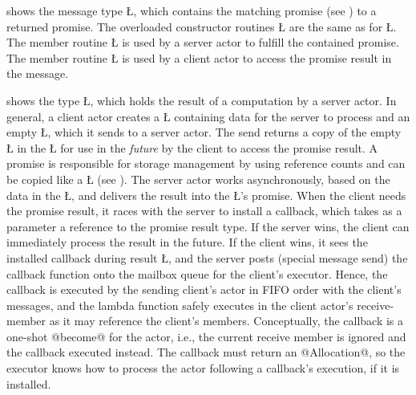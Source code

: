 \documentclass[openright,twoside]{report}
\begin{document}
 shows the message type \LGinlinetrue\LGbegin\lgrinde\L{}\endlgrinde\LGend{}, which contains the matching promise (see ) to a returned promise.
The overloaded constructor routines \LGinlinetrue\LGbegin\lgrinde\L{}\endlgrinde\LGend{} are the same as for \LGinlinetrue\LGbegin\lgrinde\L{}\endlgrinde\LGend{}.
The member routine \LGinlinetrue\LGbegin\lgrinde\L{}\endlgrinde\LGend{} is used by a server actor to fulfill the contained promise.
The member routine \LGinlinetrue\LGbegin\lgrinde\L{}\endlgrinde\LGend{} is used by a client actor to access the promise result in the message.

 shows the type \LGinlinetrue\LGbegin\lgrinde\L{}\endlgrinde\LGend{}, which holds the result of a computation by a server actor.
In general, a client actor creates a \LGinlinetrue\LGbegin\lgrinde\L{}\endlgrinde\LGend{} containing data for the server to process and an empty \LGinlinetrue\LGbegin\lgrinde\L{}\endlgrinde\LGend{}, which it sends to a server actor.
The send returns a copy of the empty \LGinlinetrue\LGbegin\lgrinde\L{}\endlgrinde\LGend{} in the \LGinlinetrue\LGbegin\lgrinde\L{}\endlgrinde\LGend{} for use in the \emph{future} by the client to access the promise result.
A promise is responsible for storage management by using reference counts and can be copied like a \LGinlinetrue\LGbegin\lgrinde\L{}\endlgrinde\LGend{} (see ).
The server actor works asynchronously, based on the data in the \LGinlinetrue\LGbegin\lgrinde\L{}\endlgrinde\LGend{}, and delivers the result into the \LGinlinetrue\LGbegin\lgrinde\L{}\endlgrinde\LGend{}'s promise.
When the client needs the promise result, it races with the server to install a callback, which takes as a parameter a reference to the promise result type.
If the server wins, the client can immediately process the result in the future.
If the client wins, it sees the installed callback during result \LGinlinetrue\LGbegin\lgrinde\L{}\endlgrinde\LGend{}, and the server posts (special message send) the callback function onto the mailbox queue for the client's executor.
Hence, the callback is executed by the sending client's actor in FIFO order with the client's messages, and the lambda function safely executes in the client actor's receive-member as it may reference the client's members.
Conceptually, the callback is a one-shot @become@ for the actor, i.e., the current receive member is ignored and the callback executed instead.
The callback must return an @Allocation@, so the executor knows how to process the actor following a callback's execution, if it is installed.
\end{document}
